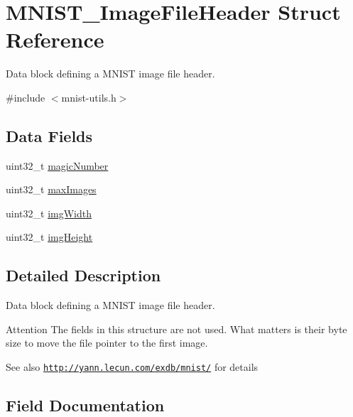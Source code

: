 \hypertarget{struct_m_n_i_s_t___image_file_header}{}\section{M\+N\+I\+S\+T\+\_\+\+Image\+File\+Header Struct Reference}
\label{struct_m_n_i_s_t___image_file_header}


Data block defining a M\+N\+I\+S\+T image file header.  




{\ttfamily \#include $<$mnist-\/utils.\+h$>$}

\subsection*{Data Fields}
\begin{DoxyCompactItemize}
\item 
uint32\+\_\+t \hyperlink{struct_m_n_i_s_t___image_file_header_a3081fb3d81f6a8484b9451a66e4d1dba}{magic\+Number}
\item 
uint32\+\_\+t \hyperlink{struct_m_n_i_s_t___image_file_header_a0c2553aeb6074229351ddfd76c613831}{max\+Images}
\item 
uint32\+\_\+t \hyperlink{struct_m_n_i_s_t___image_file_header_a68149ebeec0e98d84f4ba36ccd8c7950}{img\+Width}
\item 
uint32\+\_\+t \hyperlink{struct_m_n_i_s_t___image_file_header_a6a09bb02ac87933a7f89ac538e93f167}{img\+Height}
\end{DoxyCompactItemize}


\subsection{Detailed Description}
Data block defining a M\+N\+I\+S\+T image file header. 

\begin{DoxyAttention}{Attention}
The fields in this structure are not used. What matters is their byte size to move the file pointer to the first image. 
\end{DoxyAttention}
\begin{DoxySeeAlso}{See also}
\href{http://yann.lecun.com/exdb/mnist/}{\tt http\+://yann.\+lecun.\+com/exdb/mnist/} for details 
\end{DoxySeeAlso}


\subsection{Field Documentation}
\hypertarget{struct_m_n_i_s_t___image_file_header_a6a09bb02ac87933a7f89ac538e93f167}{}
